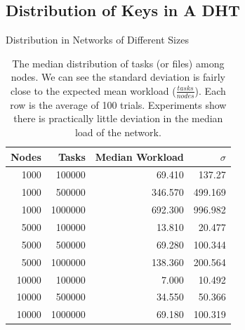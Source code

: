 \documentclass[11pt]{beamer}
\begin{document}
\subsection{Distribution of Keys in A DHT}


\begin{frame}{Distribution in Networks of Different Sizes}
\begin{table}
	\centering
	\caption{The median distribution of tasks (or files) among nodes.  We can see the standard deviation is fairly close to the expected mean workload ($\frac{tasks}{nodes}$). Each row is the average of 100 trials.  Experiments show there is practically little deviation in the median load of the network.}
	\begin{tabular}{r r r r}
		Nodes & Tasks & Median Workload & $\sigma$ \\ \hline
		1000 & 100000 & 69.410   &  137.27  \\
		1000 & 500000 & 346.570  &  499.169 \\
		1000 & 1000000 & 692.300  &  996.982 \\
		
		5000 & 100000  & 13.810 & 20.477 \\ 
		5000 & 500000  & 69.280 & 100.344 \\ 
		5000 & 1000000 &138.360 & 200.564 \\ 
		
		10000 & 100000 & 7.000   &  10.492 \\
		10000 & 500000 & 34.550  &   50.366 \\
		10000 & 1000000& 69.180  &  100.319 \\
	\end{tabular}
	\label{tab:medianLoads}
\end{table}

\end{frame}

\end{document}
